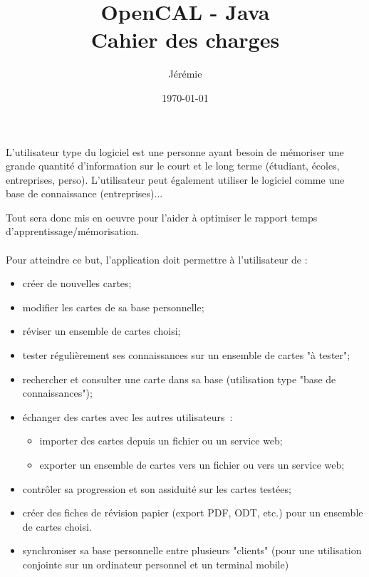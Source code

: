 \documentclass[pdftex,a4paper,11pt]{article}
\begin{document}
\title{OpenCAL - Java\\\medskip
       Cahier des charges}
\author{Jérémie }
\date{\today}

\maketitle


L'utilisateur type du logiciel est une personne ayant besoin de mémoriser une grande quantité d'information sur le court et le long terme (étudiant, écoles, entreprises, perso). L'utilisateur peut également utiliser le logiciel comme une base de connaissance (entreprises)...

Tout sera donc mis en oeuvre pour l'aider à optimiser le rapport temps d'apprentissage/mémorisation.

\paragraph{}
Pour atteindre ce but, l'application doit permettre à l'utilisateur de :
\begin{itemize}
    \item créer de nouvelles cartes;
    \item modifier les cartes de sa base personnelle;
    \item réviser un ensemble de cartes choisi;
    \item tester régulièrement ses connaissances sur un ensemble de cartes "à tester";
    \item rechercher et consulter une carte dans sa base (utilisation type "base de connaissances");
    \item échanger des cartes avec les autres utilisateurs~:
    \begin{itemize}
        \item importer des cartes depuis un fichier ou un service web;
        \item exporter un ensemble de cartes vers un fichier ou vers un service web;
    \end{itemize}
    \item contrôler sa progression et son assiduité sur les cartes testées;
    \item créer des fiches de révision papier (export PDF, ODT, etc.) pour un ensemble de cartes choisi.
    \item synchroniser sa base personnelle entre plusieurs "clients" (pour une utilisation conjointe sur un ordinateur personnel et un terminal mobile)
\end{itemize}
\end{document}
